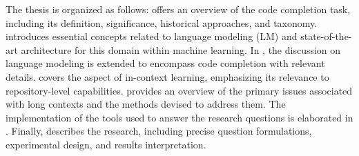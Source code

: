 The thesis is organized as follows:  offers an overview of the code completion task, including its definition, significance, historical approaches, and taxonomy.  introduces essential concepts related to language modeling (LM) and state-of-the-art architecture for this domain within machine learning. In , the discussion on language modeling is extended to encompass code completion with relevant details.  covers the aspect of in-context learning, emphasizing its relevance to repository-level capabilities.  provides an overview of the primary issues associated with long contexts and the methods devised to address them. The implementation of the tools used to answer the research questions is elaborated in . Finally,  describes the research, including precise question formulations, experimental design, and results interpretation.

